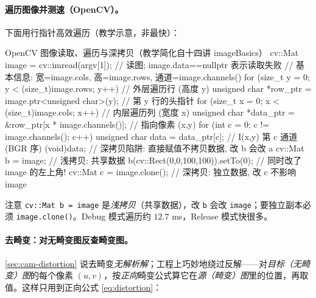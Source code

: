 \paragraph{遍历图像并测速（OpenCV）。}
下面用行指针高效遍历（教学示意，非最快）：

\begin{codebox}[C++]{OpenCV 图像读取、遍历与深拷贝（教学简化自十四讲 imageBasics）}
cv::Mat image = cv::imread(argv[1]);              // 读图; image.data==nullptr 表示读取失败
// 基本信息: 宽=image.cols, 高=image.rows, 通道=image.channels()
for (size_t y = 0; y < (size_t)image.rows; y++) { // 外层遍历行 (高度 y)
  unsigned char *row_ptr = image.ptr<unsigned char>(y);  // 第 y 行的头指针
  for (size_t x = 0; x < (size_t)image.cols; x++) {       // 内层遍历列 (宽度 x)
    unsigned char *data_ptr = &row_ptr[x * image.channels()]; // 指向像素 (x,y)
    for (int c = 0; c != image.channels(); c++) {
      unsigned char data = data_ptr[c];           // I(x,y) 第 c 通道 (BGR 序)
      (void)data;
    }
  }
}
// 深拷贝陷阱: 直接赋值不拷贝数据, 改 b 会改 a
cv::Mat b = image;            // 浅拷贝: 共享数据
b(cv::Rect(0,0,100,100)).setTo(0);   // 同时改了 image 的左上角!
cv::Mat c = image.clone();    // 深拷贝: 独立数据, 改 c 不影响 image
\end{codebox}

\noindent 注意 \texttt{cv::Mat b = image} 是\emph{浅拷贝}（共享数据），改 \texttt{b} 会改 \texttt{image}；要独立副本必须 \texttt{image.clone()}。Debug 模式遍历约 $12.7$ ms，Release 模式快很多\cite{gaoxiang2019slam14}。

\paragraph{去畸变：对无畸变图反查畸变图。}
\cref{sec:cam-distortion} 说去畸变\emph{无解析解}；工程上巧妙地绕过反解——对\emph{目标（无畸变）图}的每个像素 $(u,v)$，按\emph{正向}畸变公式算它在\emph{源（畸变）图}里的位置，再取值。这样只用到正向公式 \cref{eq:distortion}：

